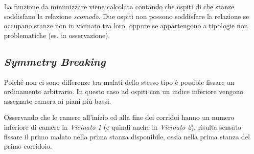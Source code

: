 \noindent
La funzione da minimizzare viene calcolata contando che ospiti di che stanze soddisfano la relazione \emph{scomodo}.
Due ospiti non possono soddisfare la relazione se occupano stanze non in vicinato tra loro, oppure se appartengono a tipologie non problematiche (es. in osservazione).


\subsection{\emph{Symmetry Breaking}}
Poiché non ci sono differenze tra malati dello stesso tipo è possible fissare un ordinamento arbitrario.
In questo caso ad ospiti con un indice inferiore vengono assegnate camera ai piani più bassi.


\noindent
Osservando che le camere all'inizio ed alla fine dei corridoi hanno un numero inferiore di camere in \emph{Vicinato 1} (e quindi anche in \emph{Vicinato 2}), risulta sensato fissare il primo malato nella prima stanza disponibile, ossia nella prima stanza del primo corridoio.




